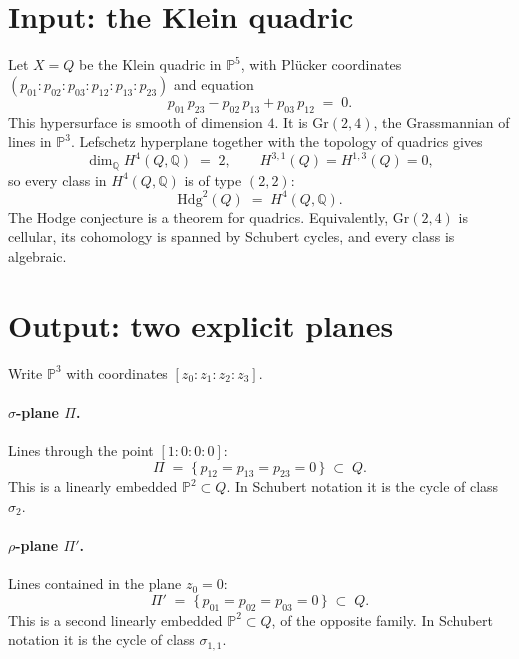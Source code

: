 \documentclass[11pt,a4paper]{article}
\newcommand{\Q}{\mathbb{Q}}
\newcommand{\Pspace}{\mathbb{P}}
\theoremstyle{definition}
\theoremstyle{remark}
\begin{document}
\section{Input: the Klein quadric}

Let \(X=Q\) be the Klein quadric in \(\Pspace^5\), with Pl\"ucker
coordinates \((p_{01}:p_{02}:p_{03}:p_{12}:p_{13}:p_{23})\) and equation
\begin{equation}
\label{eq:plucker}
p_{01}\,p_{23}-p_{02}\,p_{13}+p_{03}\,p_{12}\;=\;0.
\end{equation}
This hypersurface is smooth of dimension \(4\). It is
\(\mathrm{Gr}(2,4)\), the Grassmannian of lines in \(\Pspace^3\).
Lefschetz hyperplane together with the topology of quadrics gives
\[
\dim_{\Q}H^4(Q,\Q)\;=\;2,\qquad H^{3,1}(Q)=H^{1,3}(Q)=0,
\]
so every class in \(H^4(Q,\Q)\) is of type \((2,2)\):
\[
\mathrm{Hdg}^2(Q)\;=\;H^4(Q,\Q).
\]
The Hodge conjecture is a theorem for quadrics. Equivalently,
\(\mathrm{Gr}(2,4)\) is cellular, its cohomology is spanned by Schubert
cycles, and every class is algebraic.

\section{Output: two explicit planes}

Write \(\Pspace^3\) with coordinates \([z_0:z_1:z_2:z_3]\).

\paragraph{\(\sigma\)-plane \(\Pi\).}
Lines through the point \([1:0:0:0]\):
\begin{equation}
\label{eq:sigma}
\Pi\;=\;\bigl\{\,p_{12}=p_{13}=p_{23}=0\,\bigr\}\;\subset\;Q.
\end{equation}
This is a linearly embedded \(\Pspace^2\subset Q\). In Schubert notation
it is the cycle of class \(\sigma_2\).

\paragraph{\(\rho\)-plane \(\Pi'\).}
Lines contained in the plane \(z_0=0\):
\begin{equation}
\label{eq:rho}
\Pi'\;=\;\bigl\{\,p_{01}=p_{02}=p_{03}=0\,\bigr\}\;\subset\;Q.
\end{equation}
This is a second linearly embedded \(\Pspace^2\subset Q\), of the opposite
family. In Schubert notation it is the cycle of class \(\sigma_{1,1}\).
\end{document}
